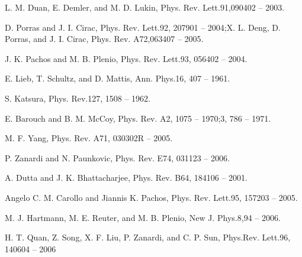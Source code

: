 \documentclass[11pt]{article}
\begin{document}
\begin{thebibliography}{3}
L. M. Duan, E. Demler, and M. D. Lukin, Phys. Rev. Lett.91,090402 -- 2003.

D. Porras and J. I. Cirac, Phys. Rev. Lett.92, 207901 -- 2004;X. L. Deng, D. Porras, and J. I. Cirac, Phys. Rev. A72,063407 -- 2005.

J. K. Pachos and M. B. Plenio, Phys. Rev. Lett.93, 056402 -- 2004.

E. Lieb, T. Schultz, and D. Mattis, Ann. Phys.16, 407 -- 1961.

S. Katsura, Phys. Rev.127, 1508 -- 1962.

E. Barouch and B. M. McCoy, Phys. Rev. A2, 1075 -- 1970;3, 786 -- 1971.

M. F. Yang, Phys. Rev. A71, 030302R -- 2005.

P. Zanardi and N. Paunkovic, Phys. Rev. E74, 031123 -- 2006.

A. Dutta and J. K. Bhattacharjee, Phys. Rev. B64, 184106 -- 2001.

Angelo C. M. Carollo and Jiannis K. Pachos, Phys. Rev. Lett.95, 157203 -- 2005.

M. J. Hartmann, M. E. Reuter, and M. B. Plenio, New J. Phys.8,94 -- 2006.

H. T. Quan, Z. Song, X. F. Liu, P. Zanardi, and C. P. Sun, Phys.Rev. Lett.96, 140604 -- 2006

\end{thebibliography}
\end{document}
